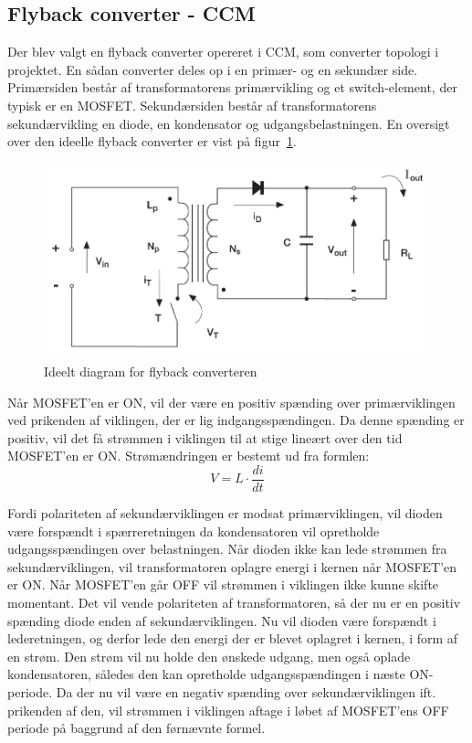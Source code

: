 
\subsection{Flyback converter - CCM}
Der blev valgt en flyback converter opereret i CCM, som converter topologi i projektet. En sådan converter deles op i en primær- og en sekundær side. Primærsiden består af transformatorens primærvikling og et switch-element, der typisk er en MOSFET. Sekundærsiden består af transformatorens sekundærvikling en diode, en kondensator og udgangsbelastningen. En oversigt over den ideelle flyback converter er vist på figur~\ref{fig:flyabck_ideal}. 

\begin{figure}[H]
	\centering
	\includegraphics[width=0.7\linewidth]{../Dokumentation/tex/1iteration/billeder/flyback_ideal.png}
	\caption{Ideelt diagram for flyback converteren
		\cite{SMPS-topologies}}
	\label{fig:flyabck_ideal}
\end{figure}

Når MOSFET'en er ON, vil der være en positiv spænding over primærviklingen ved prikenden af viklingen, der er lig indgangsspændingen. Da denne spænding er positiv, vil det få strømmen i viklingen til at stige lineært over den tid MOSFET'en er ON. Strømændringen er bestemt ud fra formlen:
\begin{equation}
V = L \cdot \frac{di}{dt}
\end{equation}

Fordi polariteten af sekundærviklingen er modsat primærviklingen, vil dioden være forspændt i spærreretningen da kondensatoren vil opretholde udgangsspændingen over belastningen. Når dioden ikke kan lede strømmen fra sekundærviklingen, vil transformatoren oplagre energi i kernen når MOSFET'en er ON. Når MOSFET'en går OFF vil strømmen i viklingen ikke kunne skifte momentant. Det vil vende polariteten af transformatoren, så der nu er en positiv spænding diode enden af sekundærviklingen. Nu vil dioden være forspændt i lederetningen, og derfor lede den energi der er blevet oplagret i kernen, i form af en strøm. Den strøm vil nu holde den ønskede udgang, men også oplade kondensatoren, således den kan opretholde udgangsspændingen i næste ON-periode. Da der nu vil være en negativ spænding over sekundærviklingen ift. prikenden af den, vil strømmen i viklingen aftage i løbet af MOSFET'ens OFF periode på baggrund af den førnævnte formel. 

